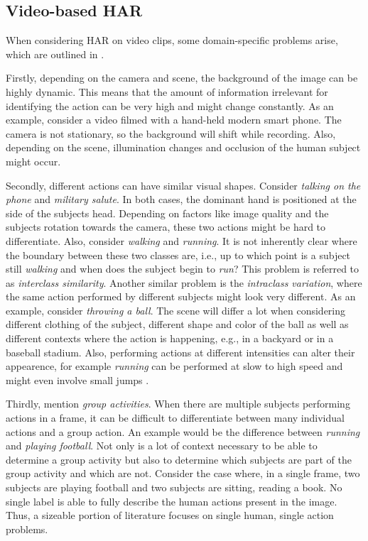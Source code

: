 \subsection{Video-based HAR}
\label{sec:video-based-har}
When considering HAR on video clips, some domain-specific problems arise, which are outlined in \cite{zhang_review_2017}.

Firstly, depending on the camera and scene, the background of the image can be highly dynamic.
This means that the amount of information irrelevant for identifying the action can be very high and might change constantly.
As an example, consider a video filmed with a hand-held modern smart phone.
The camera is not stationary, so the background will shift while recording.
Also, depending on the scene, illumination changes and occlusion of the human subject might occur.

Secondly, different actions can have similar visual shapes.
Consider \textit{talking on the phone} and \textit{military salute}.
In both cases, the dominant hand is positioned at the side of the subjects head.
Depending on factors like image quality and the subjects rotation towards the camera, these two actions might be hard to differentiate.
Also, consider \textit{walking} and \textit{running}.
It is not inherently clear where the boundary between these two classes are, i.e., up to which point is a subject still \textit{walking} and when does the subject begin to \textit{run}?
This problem is referred to as \textit{interclass similarity}.
Another similar problem is the \textit{intraclass variation}, where the same action performed by different subjects might look very different.
As an example, consider \textit{throwing a ball}.
The scene will differ a lot when considering different clothing of the subject, different shape and color of the ball as well as different contexts where the action is happening, e.g., in a backyard or in a baseball stadium.
Also, performing actions at different intensities can alter their appearence, for example \textit{running} can be performed at slow to high speed and might even involve small jumps \cite{kong_human_2018}.

Thirdly, \cite{zhang_review_2017} mention \textit{group activities}.
When there are multiple subjects performing actions in a frame, it can be difficult to differentiate between many individual actions and a group action.
An example would be the difference between \textit{running} and \textit{playing football}.
Not only is a lot of context necessary to be able to determine a group activity but also to determine which subjects are part of the group activity and which are not.
Consider the case where, in a single frame, two subjects are playing football and two subjects are sitting, reading a book.
No single label is able to fully describe the human actions present in the image.
Thus, a sizeable portion of literature focuses on single human, single action problems.

